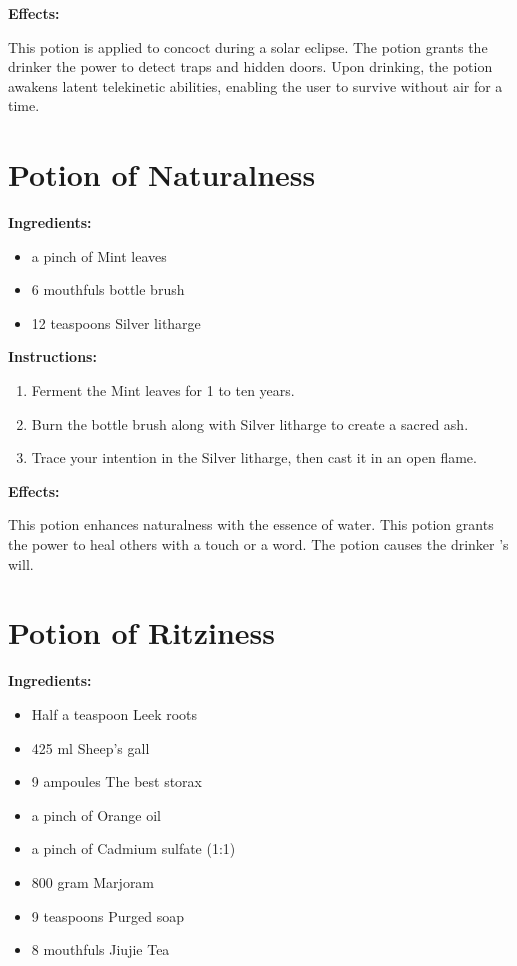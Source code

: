 \documentclass{article}
\begin{document}
\textbf{Effects:}

This potion is applied to concoct during a solar eclipse. The potion grants the drinker the power to detect traps and hidden doors. Upon drinking, the potion awakens latent telekinetic abilities, enabling the user to survive without air for a time.

\newpage
\section*{Potion of Naturalness}

\textbf{Ingredients:}

\begin{itemize}
  \item a pinch of Mint leaves
  \item 6 mouthfuls bottle brush
  \item 12 teaspoons Silver litharge
\end{itemize}

\textbf{Instructions:}

\begin{enumerate}
  \item Ferment the Mint leaves for 1 to ten years.
  \item Burn the bottle brush along with Silver litharge to create a sacred ash.
  \item Trace your intention in the Silver litharge, then cast it in an open flame.
\end{enumerate}

\textbf{Effects:}

This potion enhances naturalness with the essence of water. This potion grants the power to heal others with a touch or a word. The potion causes the drinker 's will.

\newpage
\section*{Potion of Ritziness}

\textbf{Ingredients:}

\begin{itemize}
  \item Half a teaspoon Leek roots
  \item 425 ml Sheep's gall
  \item 9 ampoules The best storax
  \item a pinch of Orange oil
  \item a pinch of Cadmium sulfate (1:1)
  \item 800 gram Marjoram
  \item 9 teaspoons Purged soap
  \item 8 mouthfuls Jiujie Tea
\end{itemize}
\end{document}
